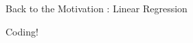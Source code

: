\documentclass{beamer}
\begin{document}
\begin{frame}{Back to the Motivation : Linear Regression} 

Coding!

\end{frame}






















\end{document}
